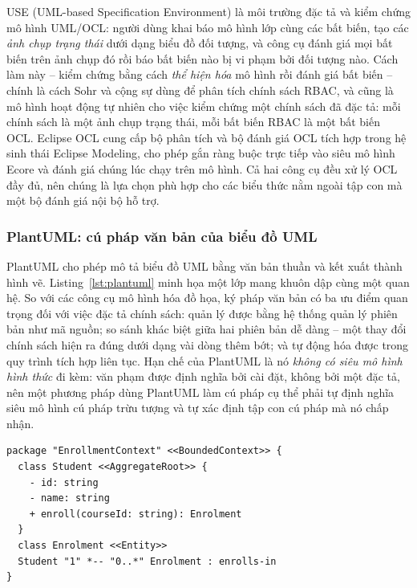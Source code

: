 USE (UML-based Specification Environment) \cite{gogolla2007} là môi trường đặc tả và kiểm chứng mô hình UML/OCL: người dùng khai báo mô hình lớp cùng các bất biến, tạo các \emph{ảnh chụp trạng thái} dưới dạng biểu đồ đối tượng, và công cụ đánh giá mọi bất biến trên ảnh chụp đó rồi báo bất biến nào bị vi phạm bởi đối tượng nào. Cách làm này -- kiểm chứng bằng cách \emph{thể hiện hóa} mô hình rồi đánh giá bất biến -- chính là cách Sohr và cộng sự \cite{sohr2008} dùng để phân tích chính sách RBAC, và cũng là mô hình hoạt động tự nhiên cho việc kiểm chứng một chính sách đã đặc tả: mỗi chính sách là một ảnh chụp trạng thái, mỗi bất biến RBAC là một bất biến OCL. Eclipse OCL \cite{eclipseocl2025} cung cấp bộ phân tích và bộ đánh giá OCL tích hợp trong hệ sinh thái Eclipse Modeling, cho phép gắn ràng buộc trực tiếp vào siêu mô hình Ecore và đánh giá chúng lúc chạy trên mô hình. Cả hai công cụ đều xử lý OCL đầy đủ, nên chúng là lựa chọn phù hợp cho các biểu thức nằm ngoài tập con mà một bộ đánh giá nội bộ hỗ trợ.

\subsubsection{PlantUML: cú pháp văn bản của biểu đồ UML}

PlantUML \cite{plantuml2025} cho phép mô tả biểu đồ UML bằng văn bản thuần và kết xuất thành hình vẽ. Listing~\ref{lst:plantuml} minh họa một lớp mang khuôn dập cùng một quan hệ. So với các công cụ mô hình hóa đồ họa, ký pháp văn bản có ba ưu điểm quan trọng đối với việc đặc tả chính sách: quản lý được bằng hệ thống quản lý phiên bản như mã nguồn; so sánh khác biệt giữa hai phiên bản dễ dàng -- một thay đổi chính sách hiện ra đúng dưới dạng vài dòng thêm bớt; và tự động hóa được trong quy trình tích hợp liên tục. Hạn chế của PlantUML là nó \emph{không có siêu mô hình hình thức} đi kèm: văn phạm được định nghĩa bởi cài đặt, không bởi một đặc tả, nên một phương pháp dùng PlantUML làm cú pháp cụ thể phải tự định nghĩa siêu mô hình cú pháp trừu tượng và tự xác định tập con cú pháp mà nó chấp nhận.

\begin{lstlisting}[language=PlantUML,caption={Lớp mang khuôn dập và quan hệ trong ký pháp PlantUML},label={lst:plantuml}]
package "EnrollmentContext" <<BoundedContext>> {
  class Student <<AggregateRoot>> {
    - id: string
    - name: string
    + enroll(courseId: string): Enrolment
  }
  class Enrolment <<Entity>>
  Student "1" *-- "0..*" Enrolment : enrolls-in
}
\end{lstlisting}

